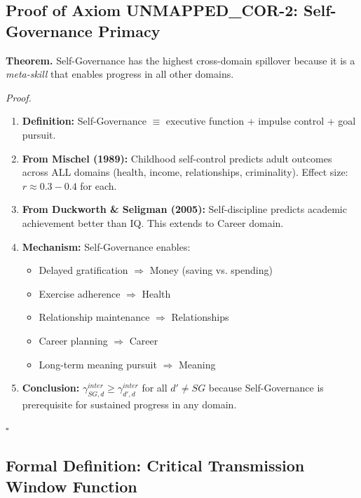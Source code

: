 \subsection{Proof of Axiom UNMAPPED_COR-2: Self-Governance Primacy}

\begin{tcolorbox}[colback=green!5!white, colframe=green!75!black, title=Theorem BI-T2: Self-Governance Primacy]
\textbf{Theorem.} Self-Governance has the highest cross-domain spillover because it is a
\textit{meta-skill} that enables progress in all other domains.

\textit{Proof.}
\begin{enumerate}
\item \textbf{Definition:} Self-Governance $\equiv$ executive function + impulse control + goal pursuit.

\item \textbf{From Mischel (1989):} Childhood self-control predicts adult outcomes across ALL domains
      (health, income, relationships, criminality). Effect size: $r \approx 0.3-0.4$ for each.

\item \textbf{From Duckworth \& Seligman (2005):} Self-discipline predicts academic achievement
      better than IQ. This extends to Career domain.

\item \textbf{Mechanism:} Self-Governance enables:
      \begin{itemize}[nosep]
      \item Delayed gratification $\Rightarrow$ Money (saving vs. spending)
      \item Exercise adherence $\Rightarrow$ Health
      \item Relationship maintenance $\Rightarrow$ Relationships
      \item Career planning $\Rightarrow$ Career
      \item Long-term meaning pursuit $\Rightarrow$ Meaning
      \end{itemize}

\item \textbf{Conclusion:} $\gamma^{inter}_{SG,d} \geq \gamma^{inter}_{d',d}$ for all $d' \neq SG$ because
      Self-Governance is prerequisite for sustained progress in any domain.
\end{enumerate}
\hfill $\square$
\end{tcolorbox}

\subsection{Formal Definition: Critical Transmission Window Function}

